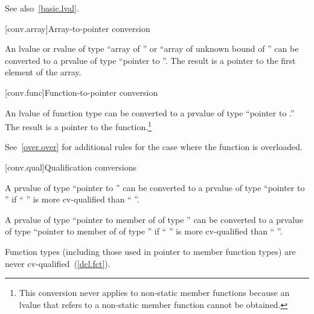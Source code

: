 \pnum
\enternote 
See also~\ref{basic.lval}.\exitnote 

[conv.array]{Array-to-pointer conversion}

\pnum
{}%
%
An lvalue or rvalue of type ``array of  '' or ``array
of unknown bound of '' can be converted to a prvalue of type
``pointer to ''. The result is a pointer to the first element
of the array.

[conv.func]{Function-to-pointer conversion}

\pnum
{}%
An lvalue of function type  can be converted to a prvalue of
type ``pointer to .'' The result is a pointer to the
function.\footnote{This conversion never applies to non-static member functions because an
lvalue that refers to a non-static member function cannot be obtained.}

\pnum
\enternote 
See~\ref{over.over} for additional rules for the case where the function
is overloaded.
\exitnote 

[conv.qual]{Qualification conversions}

\pnum
{}%
A prvalue of type ``pointer to  '' can be
converted to a prvalue of type ``pointer to  '' if
`` '' is more cv-qualified than ``
''.

\pnum
A prvalue of type ``pointer to member of  of type 
'' can be converted to a prvalue of type ``pointer to member
of  of type  '' if ``
'' is more cv-qualified than `` ''.

\pnum
\enternote 
Function types (including those used in pointer to member function
types) are never cv-qualified~(\ref{dcl.fct}).
\exitnote 

